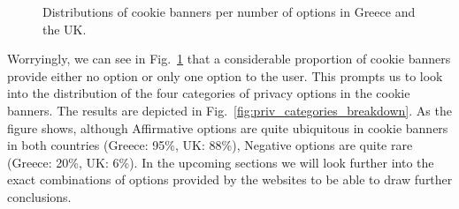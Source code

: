 \categories

\begin{figure}[t]
    \centering
    \caption{Distributions of cookie banners per number of options in Greece and the UK.}
    \label{fig:avg_options}
\end{figure}

Worryingly, we can see in Fig.~\ref{fig:avg_options} that a considerable proportion of cookie banners provide either no option or only one option to the user. 
This prompts us to look into the distribution of the four categories of privacy options in the cookie banners. 
The results are depicted in Fig.~\ref{fig:priv_categories_breakdown}. 
As the figure shows, although Affirmative options are quite ubiquitous in cookie banners in both countries (Greece: 95\%, UK: 88\%), Negative options are quite rare (Greece: 20\%, UK: 6\%). 
In the upcoming sections we will look further into the exact combinations of options provided by the websites to be able to draw further conclusions. 

\categories

